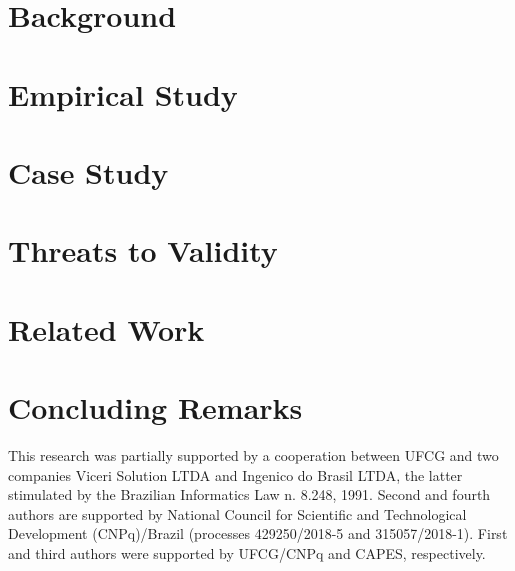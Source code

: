\documentclass[sigconf]{acmart}
\begin{document}
\section{Background}
\label{sec:background}


\section{Empirical Study}\label{sec:es}


\section{Case Study}
\label{sec:case}


\section{Threats to Validity}
\label{sec:threats}


\section{Related Work}
\label{sec:related}


\section{Concluding Remarks}
\label{sec:conclud}


\begin{acks}
This research was partially supported by a cooperation between
UFCG and two companies Viceri Solution LTDA
and Ingenico do Brasil LTDA, the latter stimulated by the
Brazilian Informatics Law n. 8.248, 1991. Second and fourth authors are supported by National Council for Scientific and Technological Development
(CNPq)/Brazil (processes 429250/2018-5 and 315057/2018-1). First and third authors were supported by UFCG/CNPq and CAPES, respectively.
\end{acks}




\end{document}
